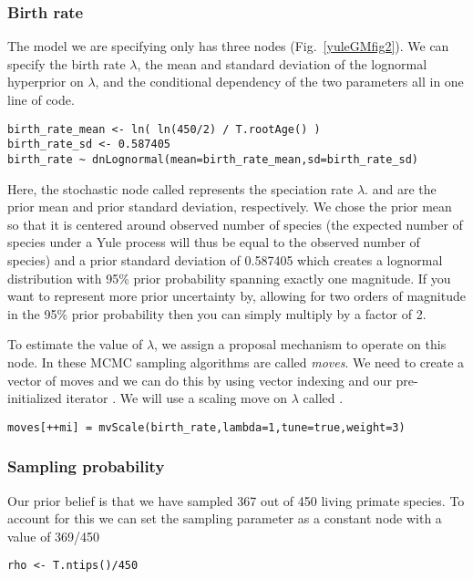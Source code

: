 \subsubsection{Birth rate}

The model we are specifying only has three nodes (Fig.~\ref{yuleGMfig2}). 
We can specify the birth rate $\lambda$, the mean and standard deviation of the lognormal hyperprior on $\lambda$, and the conditional dependency of the two parameters all in one line of \Rev code.
{\tt \begin{snugshade*}
\begin{lstlisting}
birth_rate_mean <- ln( ln(450/2) / T.rootAge() )
birth_rate_sd <- 0.587405
birth_rate ~ dnLognormal(mean=birth_rate_mean,sd=birth_rate_sd) 
\end{lstlisting}
\end{snugshade*}}
Here, the stochastic node called  represents the speciation rate $\lambda$.
 and  are the prior mean and prior standard deviation, respectively.
We chose the prior mean so that it is centered around observed number of species (\IE the expected number of species under a Yule process will thus be equal to the observed number of species) and a prior standard deviation of 0.587405 which creates a lognormal distribution with 95\% prior probability spanning exactly one magnitude.
If you want to represent more prior uncertainty by, \EG allowing for two orders of magnitude in the 95\% prior probability then you can simply multiply  by a factor of 2.

To estimate the value of $\lambda$, we assign a proposal mechanism to operate on this node. 
In \RevBayes these MCMC sampling algorithms are called \emph{moves}. 
We need to create a vector of moves and we can do this by using vector indexing and our pre-initialized iterator .
We will use a scaling move on $\lambda$ called .
{\tt \begin{snugshade*}
\begin{lstlisting}
moves[++mi] = mvScale(birth_rate,lambda=1,tune=true,weight=3)
\end{lstlisting}
\end{snugshade*}}

\subsubsection{Sampling probability}

Our prior belief is that we have sampled 367 out of 450 living primate species. 
To account for this we can set the sampling parameter as a constant node with a value of 369/450
{\tt \begin{snugshade*}
\begin{lstlisting}
rho <- T.ntips()/450
\end{lstlisting}
\end{snugshade*}}


